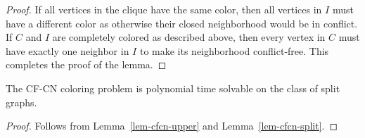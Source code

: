 \documentclass[svgnames]{llncs}
\newcommand{\cfcn}{\textsc {CF-CN}}
\begin{document}
\begin{proof}
If all vertices in the clique have the same color, then all vertices in $I$ must have a different color as otherwise their closed neighborhood would be in conflict. If $C$ and $I$ are completely colored as described above, then every vertex in $C$  must have exactly one neighbor in $I$ to make its neighborhood conflict-free. This completes the proof of the lemma.
%
%
% 
%
\end{proof}
\begin{theorem}
The \cfcn{} coloring problem is polynomial time solvable on the class of split graphs.
\end{theorem}
\begin{proof}
Follows from Lemma~\ref{lem-cfcn-upper} and Lemma~\ref{lem-cfcn-split}.
\end{proof}
\end{document}
